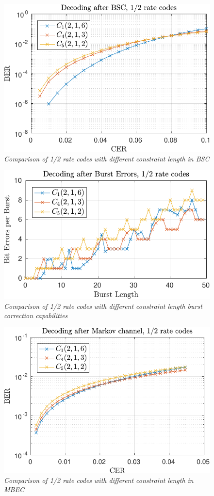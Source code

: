 \begin{figure}
\centering
\includegraphics[scale=1]{../figures/extra12rand.pdf} 
\caption{\textit{Comparison of 1/2 rate codes with different constraint length in BSC}\label{fig:constantCodeRateRandomFigure}}
\end{figure}

\begin{figure}
\centering
\includegraphics[scale=1]{../figures/extra12burst.pdf} 
\caption{\textit{Comparison of 1/2 rate codes with different constraint length burst correction capabilities}\label{fig:constantCodeRateBurstFigure}}
\end{figure}

\begin{figure}
\centering
\includegraphics[scale=1]{../figures/extra12markov.pdf} 
\caption{\textit{Comparison of 1/2 rate codes with different constraint length in MBEC}\label{fig:constantCodeRateMarkovFigure}}
\end{figure}

